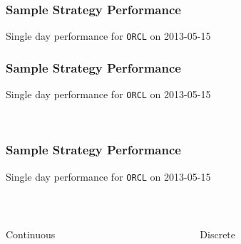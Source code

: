 \begin{frame}[t]
\frametitle{Sample Strategy Performance}
Single day performance for \texttt{ORCL} on 2013-05-15
\begin{center}
\end{center}
\end{frame}
\begin{frame}[t]
\frametitle{Sample Strategy Performance}
Single day performance for \texttt{ORCL} on 2013-05-15
\begin{center}
\\
\end{center}
\end{frame}

\begin{frame}[t]
\frametitle{Sample Strategy Performance}
Single day performance for \texttt{ORCL} on 2013-05-15
\begin{center}
\begin{columns}[T] %
\begin{column}{.5\textwidth}
\\
{\centering\scriptsize Continuous \par}
\end{column}%
\hfill%
\begin{column}{.5\textwidth}
\\
{\centering\scriptsize Discrete \par}
\end{column}%
\end{columns}
\centering
\vspace{\baselineskip}
\end{center}
\end{frame}


